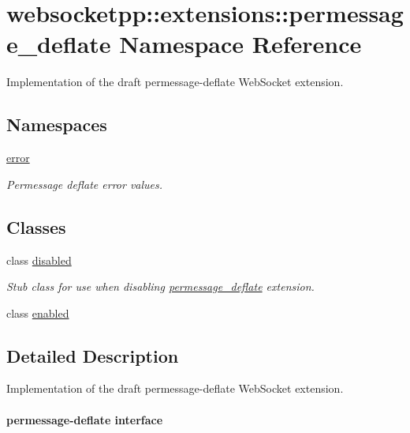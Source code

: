 \hypertarget{namespacewebsocketpp_1_1extensions_1_1permessage__deflate}{}\section{websocketpp\+:\+:extensions\+:\+:permessage\+\_\+deflate Namespace Reference}
\label{namespacewebsocketpp_1_1extensions_1_1permessage__deflate}


Implementation of the draft permessage-\/deflate Web\+Socket extension.  


\subsection*{Namespaces}
\begin{DoxyCompactItemize}
\item 
 \hyperlink{namespacewebsocketpp_1_1extensions_1_1permessage__deflate_1_1error}{error}
\begin{DoxyCompactList}\small\item\em Permessage deflate error values. \end{DoxyCompactList}\end{DoxyCompactItemize}
\subsection*{Classes}
\begin{DoxyCompactItemize}
\item 
class \hyperlink{classwebsocketpp_1_1extensions_1_1permessage__deflate_1_1disabled}{disabled}
\begin{DoxyCompactList}\small\item\em Stub class for use when disabling \hyperlink{namespacewebsocketpp_1_1extensions_1_1permessage__deflate}{permessage\+\_\+deflate} extension. \end{DoxyCompactList}\item 
class \hyperlink{classwebsocketpp_1_1extensions_1_1permessage__deflate_1_1enabled}{enabled}
\end{DoxyCompactItemize}


\subsection{Detailed Description}
Implementation of the draft permessage-\/deflate Web\+Socket extension. 

\paragraph*{permessage-\/deflate interface}

